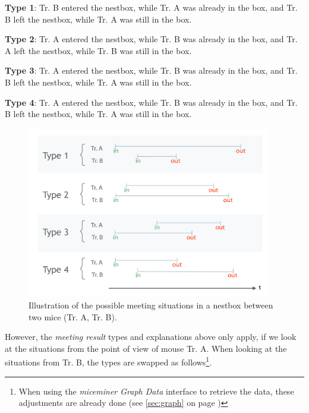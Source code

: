 \begin{mydesc}
\label{list:meeting_types}
\item \textbf{Type 1}: Tr. B entered the nestbox, while Tr. A was already in the box, and Tr. B left the nestbox, while Tr. A was still in the box. 
\item \textbf{Type 2}: Tr. A entered the nestbox, while Tr. B was already in the box, and Tr. A left the nestbox, while Tr. B was still in the box. 
\item \textbf{Type 3}: Tr. A entered the nestbox, while Tr. B was already in the box, and Tr. B left the nestbox, while Tr. A was still in the box. 
\item \textbf{Type 4}: Tr. A entered the nestbox, while Tr. B was already in the box, and Tr. B left the nestbox, while Tr. A was still in the box. 
\end{mydesc}

\begin{figure}[htpb]
\begin{center}
  \includegraphics[width=0.95\textwidth]{assets/pdf/meeting_types_schema.pdf}
  \caption[Meeting results types illustration]{Illustration of the possible meeting situations in a nestbox between two mice (Tr. A, Tr. B).}
  \label{fig:meeting_types}
\end{center}
\end{figure}

However, the \textit{meeting result} types and explanations above only apply, if we look at the situations from the point of view of mouse Tr. A. When looking at the situations from Tr. B, the types are swapped as follows\footnote{When using the \textit{miceminer Graph Data} interface to retrieve the data, these adjustments are already done (see \ref{sec:graph} on page \pageref{sec:graph})}.


